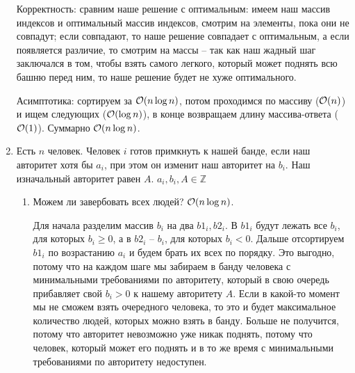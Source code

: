 \begin{enumerate}
\begin{solution}
        Корректность: сравним наше решение с оптимальным: имеем наш массив индексов и оптимальный массив индексов, смотрим на элементы, пока они не совпадут; если совпадают, то наше решение совпадает с оптимальным, а если появляется различие, то смотрим на массы -- так как наш жадный шаг заключался в том, чтобы взять самого легкого, который может поднять всю башню перед ним, то наше решение будет не хуже оптимального.

        Асимптотика: сортируем за $\mathcal{O}(n \log n)$, потом проходимся по массиву ($\mathcal{O}(n)$) и ищем следующих ($\mathcal{O}(\log n)$), в конце возвращаем длину массива-ответа ($\mathcal{O}(1)$). Суммарно $\mathcal{O}(n \log n)$.
    \end{solution}

  \item
	Есть $n$ человек. Человек $i$ готов примкнуть к нашей банде, если наш авторитет
	хотя бы $a_i$, при этом он изменит наш авторитет на $b_i$. Наш изначальный авторитет
	равен $A$. $a_i, b_i, A \in \mathbb{Z}$
	\begin{enumerate}
		\item Можем ли завербовать всех людей? $\mathcal{O}(n \log n)$.
		
        \begin{solution}
            Для начала разделим массив $b_i$ на два $b1_i, b2_i$. В $b1_i$ будут лежать все $b_i$, для которых $b_i \geq 0$, а в $b2_i$ -- $b_i$, для которых $b_i < 0$. Дальше отсортируем $b1_i$ по возрастанию $a_i$ и будем брать их всех по порядку. Это выгодно, потому что на каждом шаге мы забираем в банду человека с минимальными требованиями по авторитету, который в свою очередь прибавляет свой $b_i > 0$ к нашему авторитету $A$. Если в какой-то момент мы не сможем взять очередного человека, то это и будет максимальное количество людей, которых можно взять в банду. Больше не получится, потому что авторитет невозможно уже никак поднять, потому что человек, который может его поднять и в то же время с минимальными требованиями по авторитету недоступен.


\end{solution}
\end{enumerate}
\end{enumerate}
